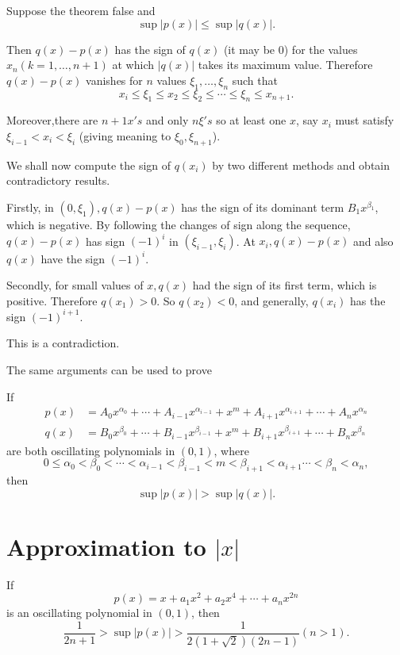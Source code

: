 Suppose the theorem false and
$$
\sup |p(x)|\leq \sup|q(x)|.
$$

Then $q(x)-p(x)$ has the sign of $q(x)$ (it may be $0$) for the values
$x_n(k=1,\ldots, n+1)$ at which $|q(x)|$ takes its maximum
value. Therefore $q(x)-p(x)$ vanishes for $n$ values $\xi_1, \ldots, 
\xi_n$ such that  
$$
x_i\leq \xi_1 \leq x_2 \leq \xi_2 \leq \cdots \leq \xi_n \leq x_{n+1}.
$$

Moreover,\pageoriginale there are $n+1x's$ and only $n \xi 's$ so at least one $x$,
say $x_i$ must satisfy $\xi_{i-1}<x_i<\xi_i$ (giving meaning to $\xi_
0,\xi_{n+1}$). 

We shall now compute the sign of $q(x_i)$ by two different methods and
obtain contradictory results. 

Firstly, in $(0, \xi_1), q(x) -p(x)$ has the sign of its dominant term
$B_1x^{\beta_1}$, which is negative. By following the changes of sign
along the sequence, $q(x)-p(x)$ has sign $(-1)^i$ in
$(\xi_{i-1},\xi_i)$. At $x_i, q(x)-p(x)$ and also $q(x)$ have the sign
$(-1)^i$. 

Secondly, for small values of $x, q(x)$ had the sign of its first
term, which is positive. Therefore $q(x_1)>0$. So $q(x_2)<0$, and
generally, $q(x_i)$ has the sign $(-1)^{i+1}$. 

This is a contradiction.

The same arguments can be used to prove
\begin{theorem*}[12 (Extension)]%
  If
  \begin{align*}
    p(x)&=A_ 0 x^{\alpha_ 0}+\cdots +
    A_{i-1}x^{\alpha_{i-1}}+x^m+A_{i+1}x^{\alpha_{i+1}}+ \cdots
    +A_nx^{\alpha_n}\\ 
    q(x)&= B_ 0 x^{\beta_ 0}+\cdots +
    B_{i-1}x^{\beta_{i-1}}+x^m+B_{i+1}x^{\beta_{i+1}}+ \cdots
    +B_nx^{\beta_n} 
  \end{align*}
  are both oscillating polynomials in $(0,1)$, where
  $$
  0 \leq \alpha_ 0 < \beta_ 0< \cdots < \alpha_{i-1}< \beta_{i-1}<m<
  \beta_{i+1}< \alpha_{i+1}\cdots <\beta_n <\alpha_n, 
  $$
  then
  $$
  \sup |p(x)|>\sup |q(x)|.
  $$
\end{theorem*}

\section{Approximation to \texorpdfstring{$|x|$}{|x|}}\label{chap3:sec9}

\begin{theorem}\label{chap3:sec9:thm13}%
  If
  $$
  p(x)=x+a_1 x^2+a_2 x^4+\cdots + a_n x^{2n}
  $$
  is an oscillating polynomial in $(0,1)$, then
  $$
  \frac{1}{2n+1} >\sup|p(x)|> \frac{1}{2(1+\sqrt{2})(2n-1)} (n>1).
  $$
\end{theorem}


